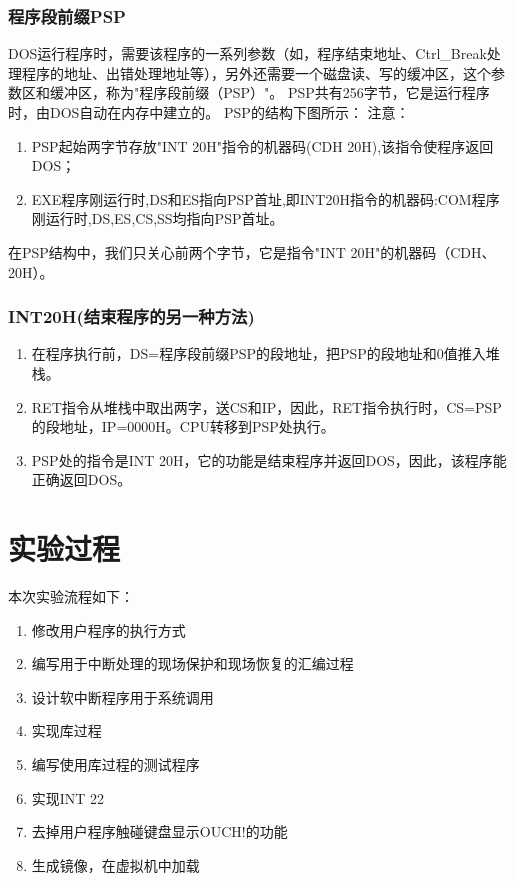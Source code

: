 \documentclass[a4paper, 11pt]{article} %
\begin{document}
\subsubsection{程序段前缀PSP} 
DOS运行程序时，需要该程序的一系列参数（如，程序结束地址、Ctrl\_Break处理程序的地址、出错处理地址等），另外还需要一个磁盘读、写的缓冲区，这个参数区和缓冲区，称为"程序段前缀（PSP）"。 PSP共有256字节，它是运行程序时，由DOS自动在内存中建立的。 PSP的结构下图所示：
注意：
\begin{enumerate}
  \item PSP起始两字节存放"INT 20H"指令的机器码(CDH 20H),该指令使程序返回DOS；
  \item EXE程序刚运行时,DS和ES指向PSP首址,即INT20H指令的机器码:COM程序刚运行时,DS,ES,CS,SS均指向PSP首址。
\end{enumerate}
在PSP结构中，我们只关心前两个字节，它是指令"INT 20H"的机器码（CDH、20H）。 

\subsubsection{INT20H(结束程序的另一种方法)} 
\begin{enumerate}
  \item 在程序执行前，DS=程序段前缀PSP的段地址，把PSP的段地址和0值推入堆栈。 
  \item RET指令从堆栈中取出两字，送CS和IP，因此，RET指令执行时，CS=PSP的段地址，IP=0000H。CPU转移到PSP处执行。
  \item PSP处的指令是INT 20H，它的功能是结束程序并返回DOS，因此，该程序能正确返回DOS。
\end{enumerate}

\section{实验过程}

本次实验流程如下：
\begin{enumerate}
  \item 修改用户程序的执行方式
  \item 编写用于中断处理的现场保护和现场恢复的汇编过程
  \item 设计软中断程序用于系统调用
  \item 实现库过程
  \item 编写使用库过程的测试程序
  \item 实现INT 22
  \item 去掉用户程序触碰键盘显示OUCH!的功能
  \item 生成镜像，在虚拟机中加载
\end{enumerate}
\end{document}
